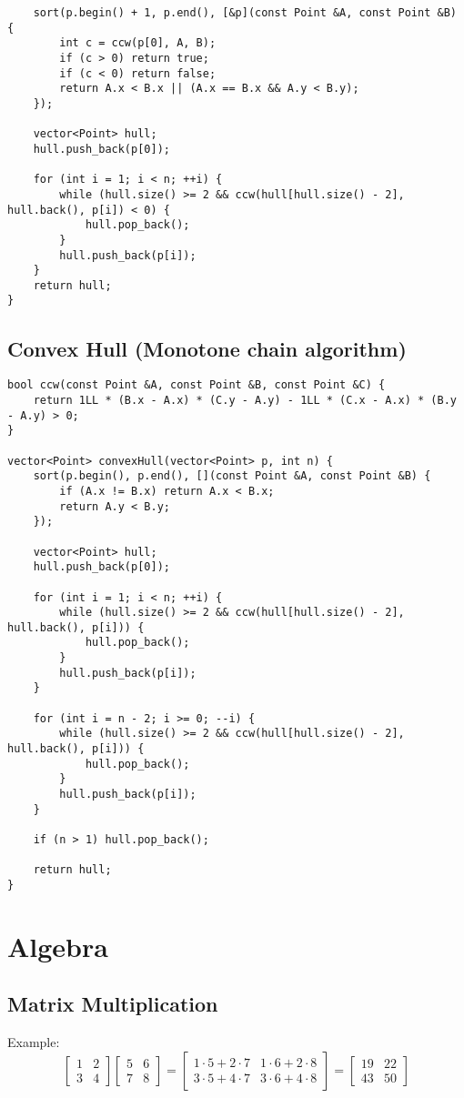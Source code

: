 \documentclass[11pt,a4paper]{article}
\begin{document}
\begin{multicols*}{2}
\begin{lstlisting}
    sort(p.begin() + 1, p.end(), [&p](const Point &A, const Point &B) {
        int c = ccw(p[0], A, B);
        if (c > 0) return true;
        if (c < 0) return false;
        return A.x < B.x || (A.x == B.x && A.y < B.y);
    });

    vector<Point> hull;
    hull.push_back(p[0]);

    for (int i = 1; i < n; ++i) {
        while (hull.size() >= 2 && ccw(hull[hull.size() - 2], hull.back(), p[i]) < 0) {
            hull.pop_back();
        }
        hull.push_back(p[i]);
    }
    return hull;
}
\end{lstlisting}

\subsection{Convex Hull (Monotone chain algorithm)}
\begin{lstlisting}
bool ccw(const Point &A, const Point &B, const Point &C) {
    return 1LL * (B.x - A.x) * (C.y - A.y) - 1LL * (C.x - A.x) * (B.y - A.y) > 0;
}

vector<Point> convexHull(vector<Point> p, int n) {
    sort(p.begin(), p.end(), [](const Point &A, const Point &B) {
        if (A.x != B.x) return A.x < B.x;
        return A.y < B.y;
    });

    vector<Point> hull;
    hull.push_back(p[0]);

    for (int i = 1; i < n; ++i) {
        while (hull.size() >= 2 && ccw(hull[hull.size() - 2], hull.back(), p[i])) {
            hull.pop_back();
        }
        hull.push_back(p[i]);
    }

    for (int i = n - 2; i >= 0; --i) {
        while (hull.size() >= 2 && ccw(hull[hull.size() - 2], hull.back(), p[i])) {
            hull.pop_back();
        }
        hull.push_back(p[i]);
    }

    if (n > 1) hull.pop_back();

    return hull;
}
\end{lstlisting}

\section{Algebra}
\subsection{Matrix Multiplication}

Example:
\[
\begin{bmatrix}
1 & 2 \\
3 & 4
\end{bmatrix}
\begin{bmatrix}
5 & 6 \\
7 & 8
\end{bmatrix}
=
\begin{bmatrix}
1\cdot 5 + 2\cdot 7 & 1\cdot 6 + 2\cdot 8 \\
3\cdot 5 + 4\cdot 7 & 3\cdot 6 + 4\cdot 8
\end{bmatrix}
=
\begin{bmatrix}
19 & 22 \\
43 & 50
\end{bmatrix}
\]


\end{multicols*}
\end{document}
